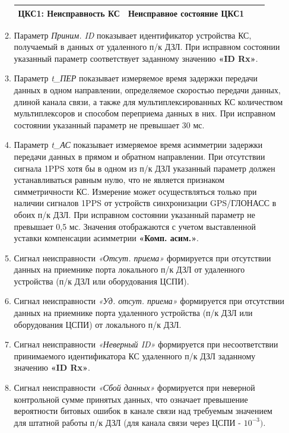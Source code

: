 \begin{enumerate}[label=\arabic{section}.\arabic{subsection}.\arabic{enumi}, labelsep=4pt, leftmargin=0pt, itemindent=57pt, itemsep=0pt, parsep=5pt]
\begin{enumerate}[label=\arabic{section}.\arabic{subsection}.\arabic{enumi}.\arabic*, labelsep=4pt, leftmargin=0em, itemindent=65pt, parsep=0pt]
\begin{longtable}{|>{\centering\arraybackslash}m{4cm}|>{\centering\arraybackslash}m{6.4cm}|>{\centering\arraybackslash}m{2.8cm}|>{\centering\arraybackslash}m{2.8cm}|}
\hline
\centering\arraybackslash ЦКС1: Неисправность КС  & \centering\arraybackslash Неисправное состояние ЦКС1 & \centering\arraybackslash 0 & \centering\arraybackslash 1 \\
\hline

\end{longtable}
\normalsize

\item
Параметр \textit{Приним. ID} показывает идентификатор устройства КС, получаемый в данных от удаленного п/к ДЗЛ.
При исправном состоянии указанный параметр соответствует заданному значению \textbf{«ID Rx»}.

\item
Параметр \textit{t\_ПЕР} показывает измеряемое время задержки передачи данных в одном направлении, определяемое скоростью передачи данных, длиной канала связи, а также для мультиплексированных КС количеством мультиплексоров и способом переприема данных в них.
При исправном состоянии указанный параметр не превышает 30 мс. 

\item
Параметр \textit{t\_АС} показывает измеряемое время асимметрии задержки передачи данных в прямом и обратном направлении.
При отсутствии сигнала 1PPS хотя бы в одном из п/к ДЗЛ указанный параметр должен устанавливаться равным нулю, что не является признаком симметричности КС.
Измерение может осуществляться только при наличии сигналов 1PPS от устройств синхронизации GPS/ГЛОНАСС в обоих п/к ДЗЛ.
При исправном состоянии указанный параметр не превышает 0,5 мс. Значения отображаются с учетом выставленной уставки компенсации асимметрии \textbf{«Комп. асим.»}.

\item
Сигнал неисправности \textit{«Отсут. приема»} формируется при отсутствии данных на приемнике порта локального п/к ДЗЛ от удаленного устройства (п/к ДЗЛ или оборудования ЦСПИ). 

\item
Сигнал неисправности \textit{«Уд. отсут. приема»} формируется при отсутствии данных на приемнике порта удаленного устройства (п/к ДЗЛ или оборудования ЦСПИ) от локального п/к ДЗЛ.

\item
Сигнал неисправности \textit{«Неверный ID»} формируется при несоответствии принимаемого идентификатора КС удаленного п/к ДЗЛ заданному значению \textbf{«ID Rx»}.

\item
Сигнал неисправности \textit{«Сбой данных»} формируется при неверной контрольной сумме принятых данных, что означает превышение вероятности битовых ошибок в канале связи над требуемым значением для штатной работы п/к ДЗЛ (для канала связи через ЦСПИ - $ 10^{-3}) $.


\end{enumerate}
\end{enumerate}
